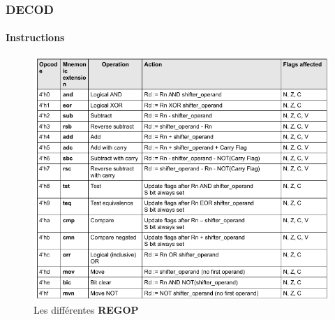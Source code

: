\documentclass{beamer}
\begin{document}
	\begin{frame}
		\frametitle{DECOD}
		\framesubtitle{Instructions}
		\begin{figure}[H]
			\includegraphics[width=\textwidth]{regop}
			\caption{Les différentes \textbf{REGOP}}
		\end{figure}
	\end{frame}
	
\end{document}
